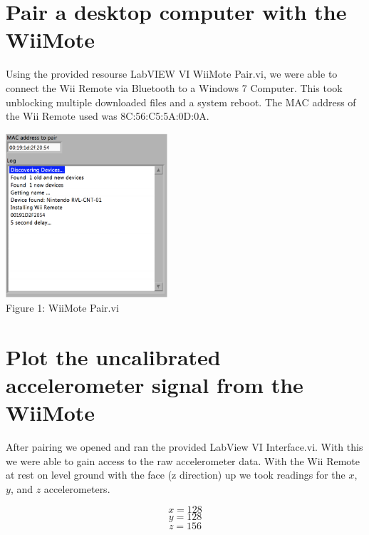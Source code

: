 \documentclass[twoside]{article}
\begin{document}
\begin{multicols}{2} %

\section{Pair a desktop computer with the WiiMote}

Using the provided resourse LabVIEW VI WiiMote Pair.vi, we were able to connect the Wii Remote via Bluetooth to a Windows 7 Computer. This took unblocking multiple downloaded files and a system reboot. The MAC address of the Wii Remote used was 8C:56:C5:5A:0D:0A.

\begin{center}
\includegraphics*[width = 6cm]{FIG1.png}\\
Figure 1: WiiMote Pair.vi
\end{center}


\section{Plot the uncalibrated accelerometer signal from the WiiMote}

After pairing we opened and ran the provided LabView VI Interface.vi. With this we were able to gain access to the raw accelerometer data. With the Wii Remote at rest on level ground with the face (z direction) up we took readings for the $x$, $y$, and $z$ accelerometers. 

\begin{equation}x = 128
\end{equation}
\begin{equation}y = 128
\end{equation}
\begin{equation}z = 156
\end{equation}


\end{multicols}
\end{document}
